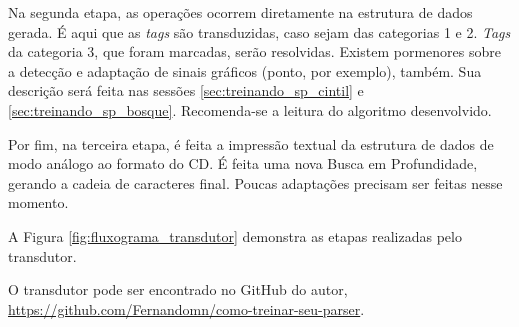 Na segunda etapa, as operações ocorrem diretamente na estrutura de dados gerada. É aqui que as \textit{tags} são transduzidas, caso sejam das categorias 1 e 2. \textit{Tags} da categoria 3, que foram marcadas, serão resolvidas. 
Existem pormenores sobre a detecção e adaptação de sinais gráficos (ponto, por exemplo), também.
Sua descrição será feita nas sessões \ref{sec:treinando_sp_cintil} e \ref{sec:treinando_sp_bosque}. Recomenda-se a leitura do algoritmo desenvolvido.

Por fim, na terceira etapa, é feita a impressão textual da estrutura de dados de modo análogo ao formato do CD. É feita uma nova Busca em Profundidade, gerando a cadeia de caracteres final. Poucas adaptações precisam ser feitas nesse momento.

A Figura \ref{fig:fluxograma_transdutor} demonstra as etapas realizadas pelo transdutor.

\begin{center}
    
\end{center}

O transdutor pode ser encontrado no GitHub do autor, \url{https://github.com/Fernandomn/como-treinar-seu-parser}.
